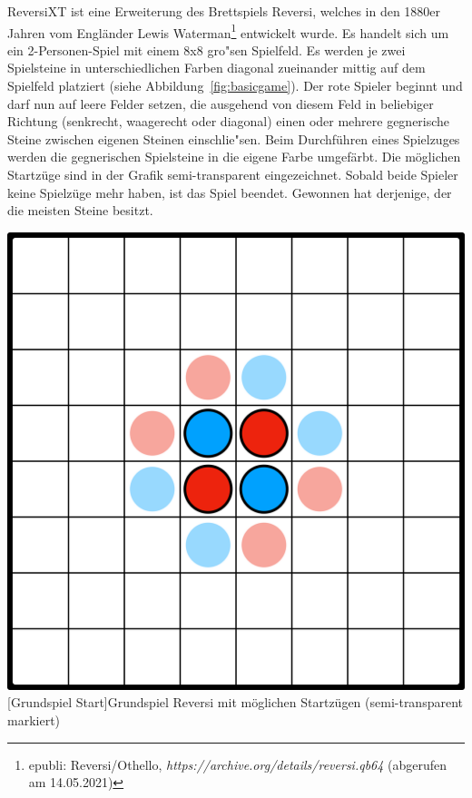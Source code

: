 ReversiXT ist eine Erweiterung des Brettspiels Reversi, welches in den 1880er Jahren vom Engl\"ander Lewis Waterman\footnote{epubli: Reversi/Othello, \textit{https://archive.org/details/reversi.qb64} (abgerufen am 14.05.2021)} entwickelt wurde.
Es handelt sich um ein 2-Personen-Spiel mit einem 8x8 gro"sen Spielfeld.
Es werden je zwei Spielsteine in unterschiedlichen Farben diagonal zueinander mittig auf dem Spielfeld platziert (siehe Abbildung~\ref{fig:basicgame}).
Der rote Spieler beginnt und darf nun auf leere Felder setzen, die ausgehend von diesem Feld in beliebiger Richtung (senkrecht, waagerecht oder diagonal) einen oder mehrere gegnerische Steine zwischen eigenen Steinen einschlie"sen.
Beim Durchf\"uhren eines Spielzuges werden die gegnerischen Spielsteine in die eigene Farbe umgef\"arbt.
Die m\"oglichen Startz\"uge sind in der Grafik semi-transparent eingezeichnet.
Sobald beide Spieler keine Spielz\"uge mehr haben, ist das Spiel beendet.
Gewonnen hat derjenige, der die meisten Steine besitzt.

\vspace{1em}
\begin{minipage}{\linewidth}
	\centering
	\includegraphics[width=0.5\linewidth]{pics/basicgame-start}
	[Grundspiel Start]{Grundspiel Reversi mit möglichen Startzügen (semi-transparent markiert)}
	\label{fig:basicgame}
\end{minipage}

